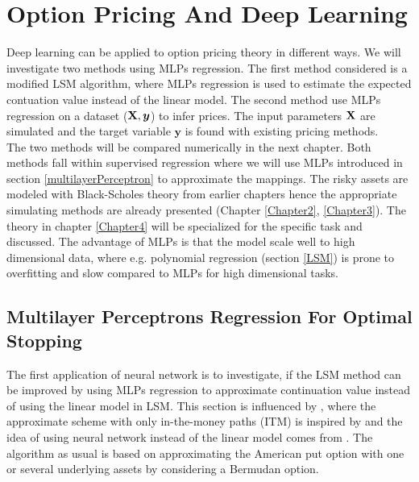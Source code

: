 
\chapter{Option Pricing And Deep Learning} %

\label{Chapter5} %

Deep learning can be applied to option pricing theory in different ways. We will investigate two methods using MLPs regression. The first method considered is a modified LSM algorithm, where MLPs regression is used to estimate the expected contuation value instead of the linear model. The second method use MLPs regression on a dataset ($\mathbf{X}, \bm{y}$) to infer prices. The input parameters $\mathbf{X}$ are simulated and the target variable $\bm{y}$ is found with existing pricing methods.\\

The two methods will be compared numerically in the next chapter. Both methods fall within supervised regression where we will use MLPs introduced in section \ref{multilayerPerceptron} to approximate the mappings. The risky assets are modeled with Black-Scholes theory from earlier chapters hence the appropriate simulating methods are already presented (Chapter \ref{Chapter2}, \ref{Chapter3}). The theory in chapter \ref{Chapter4} will be specialized for the specific task and discussed. The advantage of MLPs is that the model scale well to high dimensional data, where e.g. polynomial regression (section \ref{LSM}) is prone to overfitting and slow compared to MLPs for high dimensional tasks. 

\section{Multilayer Perceptrons Regression For Optimal Stopping}
The first application of neural network is to investigate, if the LSM method can be improved by using MLPs regression to approximate continuation value instead of using the linear model in LSM. This section is influenced by \parencite{LSM, Lelong19, KohlerMichael2010}, where the approximate scheme with only in-the-money paths (ITM) is inspired by \parencite{LSM} and the idea of using neural network instead of the linear model comes from \parencite{KohlerMichael2010, Lelong19}. The algorithm as usual is based on approximating the American put option with one or several underlying assets by considering a Bermudan option. \\

